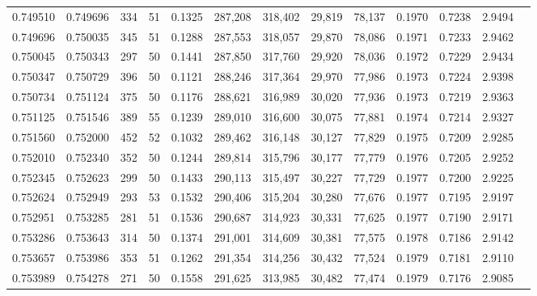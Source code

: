 \begin{tabular}{rrrrrrrrrrrrr}
0.749510 & 0.749696 &   334 &  51 &                                     0.1325 & 287,208 & 318,402 &  29,819 &  78,137 & 0.1970 & 0.7238 & 2.9494 \\
0.749696 & 0.750035 &   345 &  51 &                                     0.1288 & 287,553 & 318,057 &  29,870 &  78,086 & 0.1971 & 0.7233 & 2.9462 \\
0.750045 & 0.750343 &   297 &  50 &                                     0.1441 & 287,850 & 317,760 &  29,920 &  78,036 & 0.1972 & 0.7229 & 2.9434 \\
0.750347 & 0.750729 &   396 &  50 &                                     0.1121 & 288,246 & 317,364 &  29,970 &  77,986 & 0.1973 & 0.7224 & 2.9398 \\
0.750734 & 0.751124 &   375 &  50 &                                     0.1176 & 288,621 & 316,989 &  30,020 &  77,936 & 0.1973 & 0.7219 & 2.9363 \\
0.751125 & 0.751546 &   389 &  55 &                                     0.1239 & 289,010 & 316,600 &  30,075 &  77,881 & 0.1974 & 0.7214 & 2.9327 \\
0.751560 & 0.752000 &   452 &  52 &                                     0.1032 & 289,462 & 316,148 &  30,127 &  77,829 & 0.1975 & 0.7209 & 2.9285 \\
0.752010 & 0.752340 &   352 &  50 &                                     0.1244 & 289,814 & 315,796 &  30,177 &  77,779 & 0.1976 & 0.7205 & 2.9252 \\
0.752345 & 0.752623 &   299 &  50 &                                     0.1433 & 290,113 & 315,497 &  30,227 &  77,729 & 0.1977 & 0.7200 & 2.9225 \\
0.752624 & 0.752949 &   293 &  53 &                                     0.1532 & 290,406 & 315,204 &  30,280 &  77,676 & 0.1977 & 0.7195 & 2.9197 \\
0.752951 & 0.753285 &   281 &  51 &                                     0.1536 & 290,687 & 314,923 &  30,331 &  77,625 & 0.1977 & 0.7190 & 2.9171 \\
0.753286 & 0.753643 &   314 &  50 &                                     0.1374 & 291,001 & 314,609 &  30,381 &  77,575 & 0.1978 & 0.7186 & 2.9142 \\
0.753657 & 0.753986 &   353 &  51 &                                     0.1262 & 291,354 & 314,256 &  30,432 &  77,524 & 0.1979 & 0.7181 & 2.9110 \\
0.753989 & 0.754278 &   271 &  50 &                                     0.1558 & 291,625 & 313,985 &  30,482 &  77,474 & 0.1979 & 0.7176 & 2.9085 \\

\end{tabular}
